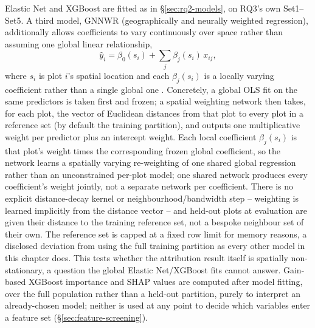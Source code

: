 Elastic Net and XGBoost are fitted as in \S\ref{sec:rq2-models}, on RQ3's own Set1--Set5. A third
model, GNNWR (geographically and neurally weighted regression), additionally allows coefficients
to vary continuously over space rather than assuming one global linear relationship,
\begin{equation}
\hat y_i = \beta_0(s_i) + \sum_j \beta_j(s_i)\,x_{ij},
\label{eq:gnnwr}
\end{equation}
where $s_i$ is plot $i$'s spatial location and each $\beta_j(s_i)$ is a locally varying
coefficient rather than a single global one \citep{du2020}. %
Concretely, a global OLS fit on the same predictors is taken first and frozen; a spatial weighting
network then takes, for each plot, the vector of Euclidean distances from that plot to every plot
in a reference set (by default the training partition), and outputs one multiplicative weight per
predictor plus an intercept weight. Each local coefficient $\beta_j(s_i)$ is that plot's weight
times the corresponding frozen global coefficient, so the network learns a spatially varying
re-weighting of one shared global regression rather than an unconstrained per-plot model; one
shared network produces every coefficient's weight jointly, not a separate network per coefficient.
There is no explicit distance-decay kernel or neighbourhood/bandwidth step -- weighting is learned
implicitly from the distance vector -- and held-out plots at evaluation are given their distance to
the training reference set, not a bespoke neighbour set of their own. The reference set is capped
at a fixed row limit for memory reasons, a disclosed deviation from using the full training
partition as every other model in this chapter does. This tests whether the attribution result
itself is spatially non-stationary, a question the global Elastic Net/XGBoost fits cannot answer.
Gain-based XGBoost importance and SHAP values are
computed after model fitting, over the full population rather than a held-out partition, purely to
interpret an already-chosen model; neither is used at any point to decide which variables enter a
feature set (\S\ref{sec:feature-screening}).

